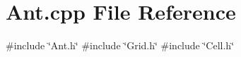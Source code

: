 \section{Ant.\+cpp File Reference}
\label{Ant_8cpp}
{\ttfamily \#include \char`\"{}Ant.\+h\char`\"{}}\newline
{\ttfamily \#include \char`\"{}Grid.\+h\char`\"{}}\newline
{\ttfamily \#include \char`\"{}Cell.\+h\char`\"{}}\newline
